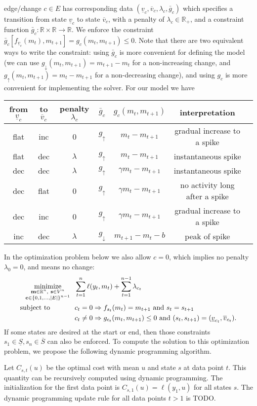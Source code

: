 \documentclass{article}
\DeclareMathOperator*{\minimize}{minimize}
\newcommand{\RR}{\mathbb R}
\begin{document}
edge/change $c\in E$ has corresponding data
$(\underline v_c, \overline v_c, \lambda_c, \bar g_c)$ which specifies
a transition from state $\underline v_c$ to state $\overline v_c$,
with a penalty of $\lambda_c\in\RR_+$, and a constraint function
$\bar g_c:\RR\times\RR\rightarrow\RR$. We enforce the constraint
$\bar g_c[f_{\underline v_c}(m_t), m_{t+1}]= g_c(m_t, m_{t+1})\leq
0$. Note that there are two equivalent ways to write the constraint:
using $\bar g_c$ is more convenient for defining the model (we can use
$g_\downarrow(m_t,m_{t+1})=m_{t+1}-m_t$ for a non-increasing change, and
$g_\uparrow(m_t,m_{t+1})=m_t-m_{t+1}$ for a non-decreasing change), and using
$g_c$ is more convenient for implementing the solver. For our model we
have
\begin{center}
  \begin{tabular}{ccccccc}
  from $\underline v_c$ & to $\overline v_c$ & penalty $\lambda_c$ &
  $\bar g_c$ & $g_c(m_t, m_{t+1})$ & interpretation\\
  \hline
  flat & inc & 0 & $g_\uparrow$ & $m_t-m_{t+1}$ & gradual increase to a spike\\
  flat & dec & $\lambda$ & $g_\uparrow$ & $m_t-m_{t+1}$ & instantaneous spike\\
  dec & dec & $\lambda$ & $g_\uparrow$ & $\gamma m_t-m_{t+1}$ & instantaneous spike\\
  dec & flat & 0 & $g_\uparrow$ & $\gamma m_t-m_{t+1}$ & no activity long after a spike\\
  dec & inc & 0 & $g_\uparrow$ & $\gamma m_t-m_{t+1}$ & gradual increase to a spike\\
  inc & dec & $\lambda$ & $g_\downarrow$ & $m_{t+1}-m_t-b$ & peak of spike
\end{tabular}
\end{center}
In the optimization problem below we
also allow $c=0$, which implies no penalty $\lambda_0=0$, and means no
change:
\begin{align}
  \label{eq:GFPOP_problem}
  \minimize_{
    \substack{
    \mathbf m\in\RR^n,\ \mathbf s\in V^n\\
\mathbf c\in \{0,1,\dots,|E|\}^{n-1}
}
    } &\ \ 
  \sum_{t=1}^n \ell(y_t, m_t) + \sum_{t=1}^{n-1} \lambda_{c_t} \\
  \text{subject to \hskip 0.9cm} &\ \ c_t = 0 \Rightarrow f_{s_t}(m_t) = m_{t+1}
\text{ and } s_t= s_{t+1}
  \nonumber\\
&\ \ c_t \neq 0 \Rightarrow g_{c_t}(m_t, m_{t+1})\leq 0\text{ and }
(s_t,s_{t+1})=(\underline v_{c_t}, \overline v_{c_t}).
\nonumber
\end{align}
If some states are desired at the start or end, then those constraints
$s_1\in \underline S, s_n\in\overline S$ can also be enforced.  To
compute the solution to this optimization problem, we propose the
following dynamic programming algorithm.

Let $C_{s,t}(u)$ be the optimal cost with mean $u$ and state $s$ at
data point $t$. This quantity can be recursively computed using
dynamic programming. The initialization for the first data point is
$ C_{s,1}(u) = \ell(y_1, u)$ for all states $s$. The dynamic
programming update rule for all data points $t>1$ is TODO.
\end{document}
